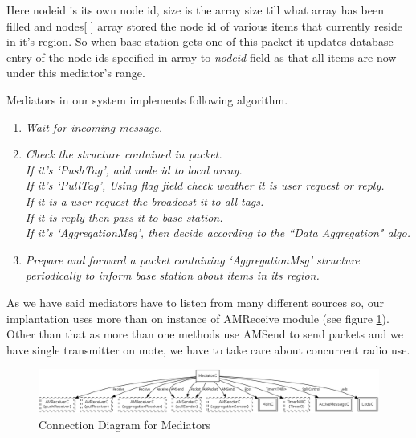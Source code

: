 \documentclass [a4paper,12pt]{book}
\begin{document}
Here nodeid is its own node id, size is the array size till what array has been filled and nodes[ ] array stored the node id of various items that currently reside in it's region. So when base station gets one of this packet it updates database entry of the node ids specified in array to \emph{nodeid} field as that all items are now under this mediator's range.

Mediators in our system implements following algorithm.

\begin{framed}
\begin{enumerate}
\item \textit{Wait for incoming message.}
\item\textit{Check the structure contained in packet.}\\
\hspace*{1em}\textit{If it's `PushTag', add node id to local array.}\\
\hspace*{1em}\textit{If it's `PullTag', Using flag field check weather it is user request or reply.}\\
\hspace*{3em}\textit{If it is a user request the broadcast it to all tags.}\\
\hspace*{3em}\textit{If it is reply then pass it to base station.}\\
\hspace*{1em}\textit{If it's `AggregationMsg', then decide according to the ``Data Aggregation" algo. }
\item \textit{Prepare and forward a packet containing `AggregationMsg' structure periodically to inform base station about items in its region.}
\end{enumerate}
\end{framed}

As we have said mediators have to listen from many different sources so, our implantation uses more than on instance of AMReceive module (see figure \ref{mediator_dia}). Other than that as more than one methods use AMSend to send packets and we have single transmitter on mote, we have to take care about concurrent radio use.

\vspace{0.5cm}
\begin{figure}[!h]
\begin{center}
\includegraphics[scale=0.35]{images/22.png}
\caption{Connection Diagram for Mediators}
\label{mediator_dia}
\end{center}
\end{figure}
\end{document}
